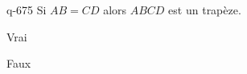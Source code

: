 \begin{truefalse}{q-675}
Si $AB=CD$ alors $ABCD$ est un trapèze.
\item Vrai
\item* Faux
\end{truefalse}

